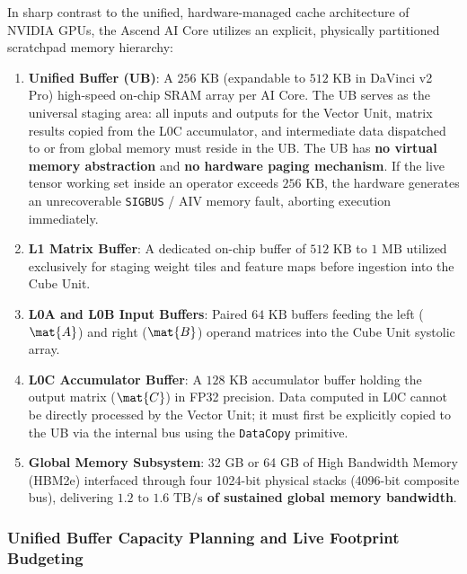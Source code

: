 In sharp contrast to the unified, hardware-managed cache architecture of NVIDIA GPUs, the Ascend AI Core utilizes an explicit, physically partitioned scratchpad memory hierarchy:
\begin{enumerate}
    \item \textbf{Unified Buffer (UB)}: A $256\text{ KB}$ (expandable to $512\text{ KB}$ in DaVinci v2 Pro) high-speed on-chip SRAM array per AI Core. The UB serves as the universal staging area: all inputs and outputs for the Vector Unit, matrix results copied from the L0C accumulator, and intermediate data dispatched to or from global memory must reside in the UB. The UB has \textbf{no virtual memory abstraction} and \textbf{no hardware paging mechanism}. If the live tensor working set inside an operator exceeds $256\text{ KB}$, the hardware generates an unrecoverable \texttt{SIGBUS} / AIV memory fault, aborting execution immediately.
    \item \textbf{L1 Matrix Buffer}: A dedicated on-chip buffer of $512\text{ KB}$ to $1\text{ MB}$ utilized exclusively for staging weight tiles and feature maps before ingestion into the Cube Unit.
    \item \textbf{L0A and L0B Input Buffers}: Paired $64\text{ KB}$ buffers feeding the left ($\mat{A}$) and right ($\mat{B}$) operand matrices into the Cube Unit systolic array.
    \item \textbf{L0C Accumulator Buffer}: A $128\text{ KB}$ accumulator buffer holding the output matrix ($\mat{C}$) in FP32 precision. Data computed in L0C cannot be directly processed by the Vector Unit; it must first be explicitly copied to the UB via the internal bus using the \texttt{DataCopy} primitive.
    \item \textbf{Global Memory Subsystem}: 32 GB or 64 GB of High Bandwidth Memory (HBM2e) interfaced through four 1024-bit physical stacks (4096-bit composite bus), delivering \textbf{$1.2\text{ to }1.6\text{ TB/s}$ of sustained global memory bandwidth}.
\end{enumerate}

\subsubsection{Unified Buffer Capacity Planning and Live Footprint Budgeting}
\label{sec:appendix_ascend_ub_budgeting}

